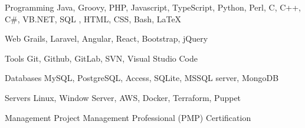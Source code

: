 
\begin{cvskills}

  \cvskill
    {Programming} %
    {Java, Groovy, PHP, Javascript, TypeScript, Python, Perl, C, C++, C\#, VB.NET, SQL , HTML, CSS, Bash, \LaTeX} %

  \cvskill
    {Web} %
    {Grails, Laravel, Angular, React, Bootstrap, jQuery} %

  \cvskill
    {Tools} %
    {Git, Github, GitLab, SVN, Visual Studio Code} %

  \cvskill
    {Databases} %
    {MySQL, PostgreSQL, Access, SQLite, MSSQL server, MongoDB} %

  \cvskill
    {Servers} %
    {Linux, Window Server, AWS, Docker, Terraform, Puppet} %


  \cvskill
    {Management} %
    {Project Management Professional (PMP) Certification} %


\end{cvskills}
